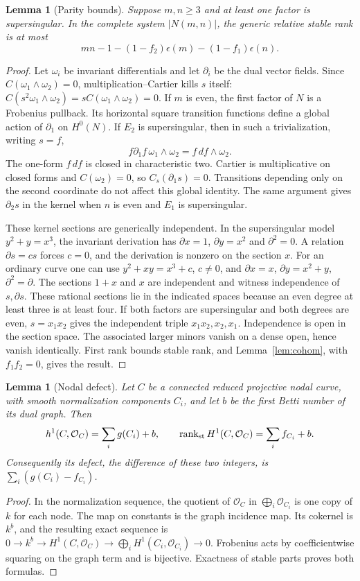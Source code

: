 \documentclass[11pt]{article}
\newtheorem{lemma}[theorem]{Lemma}
\theoremstyle{definition}\newtheorem{definition}[theorem]{Definition}
\theoremstyle{remark}\newtheorem{remark}[theorem]{Remark}
\newcommand{\OO}{\mathcal O}
\newcommand{\rk}{\operatorname{rank}}
\begin{document}
\begin{lemma}[Parity bounds]\label{lem:upper}
Suppose $m,n\ge3$ and at least one factor is supersingular. In the complete system $|N(m,n)|$, the generic relative stable rank is at most
\[
 mn-1-(1-f_2)\epsilon(m)-(1-f_1)\epsilon(n).
\]
\end{lemma}
\begin{proof}
Let $\omega_i$ be invariant differentials and let $\partial_i$ be the dual vector fields. Since $C(\omega_1\wedge\omega_2)=0$, multiplication--Cartier kills $s$ itself:
$C(s^2\omega_1\wedge\omega_2)=sC(\omega_1\wedge\omega_2)=0$.
If $m$ is even, the first factor of $N$ is a Frobenius pullback. Its horizontal square transition functions define a global action of $\partial_1$ on $H^0(N)$. If $E_2$ is supersingular, then in such a trivialization, writing $s=f$,
\[
 f\partial_1f\,\omega_1\wedge\omega_2=f\,df\wedge\omega_2.
\]
The one-form $f\,df$ is closed in characteristic two. Cartier is multiplicative on closed forms and $C(\omega_2)=0$, so $C_s(\partial_1s)=0$. Transitions depending only on the second coordinate do not affect this global identity. The same argument gives $\partial_2s$ in the kernel when $n$ is even and $E_1$ is supersingular.

These kernel sections are generically independent. In the supersingular model $y^2+y=x^3$, the invariant derivation has $\partial x=1$, $\partial y=x^2$ and $\partial^2=0$. A relation $\partial s=cs$ forces $c=0$, and the derivation is nonzero on the section $x$. For an ordinary curve one can use $y^2+xy=x^3+c$, $c\ne0$, and $\partial x=x$, $\partial y=x^2+y$, $\partial^2=\partial$. The sections $1+x$ and $x$ are independent and witness independence of $s,\partial s$. These rational sections lie in the indicated spaces because an even degree at least three is at least four. If both factors are supersingular and both degrees are even, $s=x_1x_2$ gives the independent triple $x_1x_2,x_2,x_1$. Independence is open in the section space. The associated larger minors vanish on a dense open, hence vanish identically. First rank bounds stable rank, and Lemma~\ref{lem:cohom}, with $f_1f_2=0$, gives the result.
\end{proof}

\begin{lemma}[Nodal defect]\label{lem:nodal}
Let $C$ be a connected reduced projective nodal curve, with smooth normalization components $C_i$, and let $b$ be the first Betti number of its dual graph. Then
\[
 h^1(C,\OO_C)=\sum_i g(C_i)+b,\qquad
 \rk_{\rm st}H^1(C,\OO_C)=\sum_i f_{C_i}+b.
\]
Consequently its defect, the difference of these two integers, is $\sum_i(g(C_i)-f_{C_i})$.
\end{lemma}
\begin{proof}
In the normalization sequence, the quotient of $\OO_C$ in $\bigoplus_i\OO_{C_i}$ is one copy of $k$ for each node. The map on constants is the graph incidence map. Its cokernel is $k^b$, and the resulting exact sequence is
$0\to k^b\to H^1(C,\OO_C)\to\bigoplus_iH^1(C_i,\OO_{C_i})\to0$.
Frobenius acts by coefficientwise squaring on the graph term and is bijective. Exactness of stable parts proves both formulas.
\end{proof}
\end{document}
